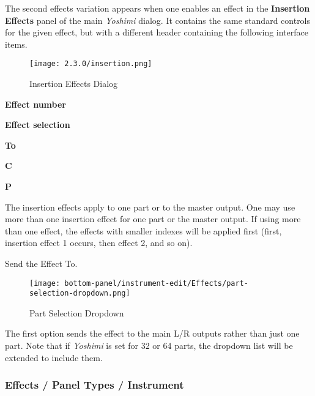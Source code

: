    The second effects variation
   appears when one enables an effect in the
   \textbf{Insertion Effects}
   panel of the main \textsl{Yoshimi} dialog.
   It contains the same standard controls for the given effect, but with
   a different header containing the following interface items.

\begin{figure}[H]
   \centering
   \texttt{[image: 2.3.0/insertion.png]}
   \caption{Insertion Effects Dialog}
   \label{fig:insertion_effects_dialog}
\end{figure}

   \begin{enumber}
      \item \textbf{Effect number}
      \item \textbf{Effect selection}
      \item \textbf{To}
      \item \textbf{C}
      \item \textbf{P}
   \end{enumber}

   The insertion effects apply to one part or to the master output.
   One may use more    than one insertion effect for one part or the
   master output. If using more than one effect, the effects with smaller
   indexes will be applied first (first, insertion effect 1 occurs, then
   effect 2, and so on).

   \setcounter{ItemCounter}{0}     %

   Send the Effect To.

\begin{figure}[H]
   \centering
   \texttt{[image: bottom-panel/instrument-edit/Effects/part-selection-dropdown.png]}
   \caption{Part Selection Dropdown}
   \label{fig:sample_part_selection_dropdown}
\end{figure}
   The first option sends the effect to the main L/R outputs rather than
   just one part.
   Note that if \textsl{Yoshimi} is set for 32 or 64 parts, the dropdown list
   will be extended to include them.

\subsubsection{Effects / Panel Types / Instrument }
\label{subsubsec:effects_paneltypes_instrument}

